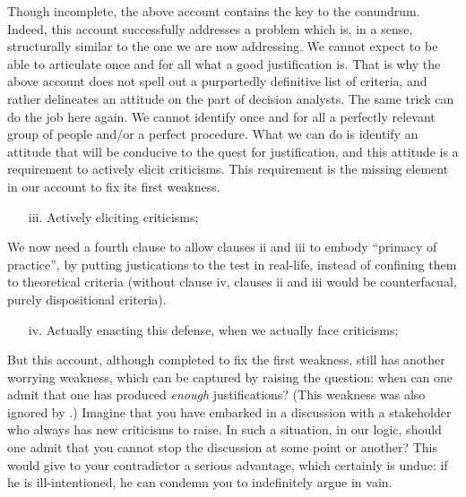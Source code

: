 \documentclass[preprint, french, english, 11pt, authoryear]{elsarticle}%
\begin{document}
Though incomplete, the above account contains the key to the conundrum. Indeed, this account successfully addresses a problem which is, in a sense, structurally similar to the one we are now addressing. We cannot expect to be able to articulate once and for all what a good justification is. That is why the above account does not spell out a purportedly definitive list of criteria, and rather delineates an attitude on the part of decision analysts. The same trick can do the job here again. We cannot identify once and for all a perfectly relevant group of people and/or a perfect procedure. What we can do is identify an attitude that will be conducive to the quest for justification, and this attitude is a requirement to actively elicit criticisms. This requirement is the missing element in our account to fix its first weakness.

\begin{itemize}
\item[iii.]	Actively eliciting criticisms;
\end{itemize}

We now need a fourth clause to allow clauses ii and iii to embody ``primacy of practice'', by putting justications to the test in real-life, instead of confining them to theoretical criteria (without clause iv, clauses ii and iii would be counterfacual, purely dispositional criteria).

\begin{itemize}
\item[iv.]	Actually enacting this defense, when we actually face criticisms;
\end{itemize}

But this account, although completed to fix the first weakness, still has another worrying weakness, which can be captured by raising the question: when can one admit that one has produced \emph{enough} justifications? (This weakness was also ignored by  \citet{meinard_what_2017}.) Imagine that you have embarked in a discussion with a stakeholder who always has new criticisms to raise. In such a situation, in our logic, should one admit that you cannot stop the discussion at some point or another? This would give to your contradictor a serious advantage, which certainly is undue: if he is ill-intentioned, he can condemn you to indefinitely argue in vain.
\end{document}
